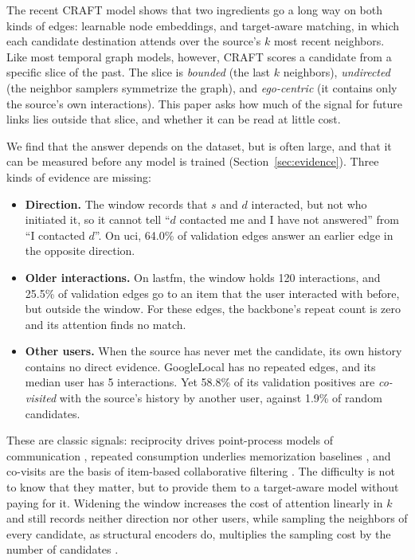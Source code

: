\documentclass[twoside]{article}
\begin{document}
The recent CRAFT model \citep{yi2025craft} shows that two ingredients go a long way on both kinds of edges: learnable node embeddings, and target-aware matching, in which each candidate destination attends over the source's $k$ most recent neighbors. Like most temporal graph models, however, CRAFT scores a candidate from a specific slice of the past. The slice is \emph{bounded} (the last $k$ neighbors), \emph{undirected} (the neighbor samplers symmetrize the graph), and \emph{ego-centric} (it contains only the source's own interactions). This paper asks how much of the signal for future links lies outside that slice, and whether it can be read at little cost.

We find that the answer depends on the dataset, but is often large, and that it can be measured before any model is trained (Section~\ref{sec:evidence}). Three kinds of evidence are missing:
\begin{itemize}
\item \textbf{Direction.} The window records that $s$ and $d$ interacted, but not who initiated it, so it cannot tell ``$d$ contacted me and I have not answered'' from ``I contacted $d$''. On uci, 64.0\% of validation edges answer an earlier edge in the opposite direction.
\item \textbf{Older interactions.} On lastfm, the window holds 120 interactions, and 25.5\% of validation edges go to an item that the user interacted with before, but outside the window. For these edges, the backbone's repeat count is zero and its attention finds no match.
\item \textbf{Other users.} When the source has never met the candidate, its own history contains no direct evidence. GoogleLocal has no repeated edges, and its median user has 5 interactions. Yet 58.8\% of its validation positives are \emph{co-visited} with the source's history by another user, against 1.9\% of random candidates.
\end{itemize}

These are classic signals: reciprocity drives point-process models of communication \citep{blundell2012modelling}, repeated consumption underlies memorization baselines \citep{poursafaei2022towards}, and co-visits are the basis of item-based collaborative filtering \citep{sarwar2001item}. The difficulty is not to know that they matter, but to provide them to a target-aware model without paying for it. Widening the window increases the cost of attention linearly in $k$ and still records neither direction nor other users, while sampling the neighbors of every candidate, as structural encoders do, multiplies the sampling cost by the number of candidates \citep{yi2025craft}.
\end{document}
